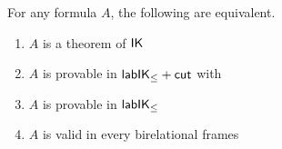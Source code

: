 \documentclass[twoside]{aiml20}
\begin{document}
\begin{theorem}\label{thm:cutfree-compl}
	For any formula $A$, the following are equivalent.
	\begin{enumerate}
		\item\label{i} $A$ is a theorem of $\mathsf{IK}$ 
		\item\label{ii} $A$ is provable in $\mathsf{lab}\mathsf{IK}_{\le} +\mathsf{cut}_{}$ with %
		\smash{%
			\scalebox{.9}{$\vliinf{\labrn{cut}}{}{\B_1, \B_2, \Left \SEQ \Right}{\B_1, \Left \SEQ \Right, \labels{z}{C}}{\B_2, \Left, \labels{z}{C} \SEQ \Right}$}
		}%
		\item\label{iii} $A$ is provable in $\mathsf{lab}\mathsf{IK}_{\le}$
		\item\label{iv} $A$ is valid in every birelational frames %
	\end{enumerate}
\end{theorem}
\end{document}
